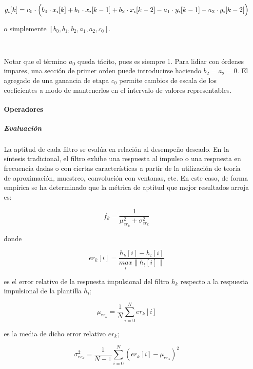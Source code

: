 \documentclass[11pt]{article}
\begin{document}
\begin{equation}
y_i[k] = c_0 \cdot \Bigl( b_0 \cdot x_i[k] + b_1 \cdot x_i[k-1] + b_2 \cdot x_i[k-2] - a_1 \cdot y_i[k-1] - a_2 \cdot y_i[k-2] \Bigr)
\end{equation}


o simplemente \([b_0, b_1, b_2, a_1, a_2, c_0]\).

    
    \begin{center}
    \end{center}
    { \hspace*{\fill} \\}
    

    Notar que el término \(a_0\) queda tácito, pues es siempre 1. Para
lidiar con órdenes impares, una sección de primer orden puede
introducirse haciendo \(b_2 = a_2 = 0\). El agregado de una ganancia de
etapa \(c_0\) permite cambios de escala de los coeficientes a modo de
mantenerlos en el intervalo de valores representables.

\paragraph{Operadores}\label{operadores}

\subparagraph{Evaluación}\label{evaluaciuxf3n}

La aptitud de cada filtro se evalúa en relación al desempeño deseado. En
la síntesis tradicional, el filtro exhibe una respuesta al impulso o una
respuesta en frecuencia dadas o con ciertas características a partir de
la utilización de teoría de aproximación, muestreo, convolución con
ventanas, etc. En este caso, de forma empírica se ha determinado que la
métrica de aptitud que mejor resultados arroja es:

\[
f_k = \frac{1}{\mu_{er_k}^2 + \sigma_{er_k}^2}
\]

donde

\[
er_k[i] = \frac{h_k[i] - h_t[i]}{\underset{i}{max} \|h_t[i]\|}
\]

es el error relativo de la respuesta impulsional del filtro \(h_k\)
respecto a la respuesta impulsional de la plantilla \(h_t\);

\[
\mu_{er_k} = \frac{1}{N} \sum^N_{i = 0} er_k[i]
\]

es la media de dicho error relativo \(er_k\);

\[
\sigma^2_{er_k} = \frac{1}{N - 1} \sum^N_{i = 0} (er_k[i] - \mu_{er_k})^2
\]
\end{document}
